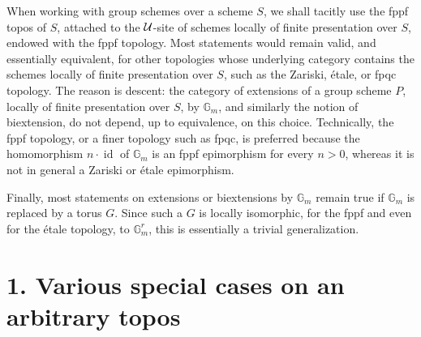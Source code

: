 \documentclass[11pt]{article}
\providecommand{\Gm}{\mathbb G_m}
\providecommand{\id}{\operatorname{id}}
\begin{document}
When working with group schemes over a scheme \(S\), we shall tacitly use the fppf topos of \(S\), attached to the \(\mathcal U\)-site of schemes locally of finite presentation over \(S\), endowed with the fppf topology.  Most statements would remain valid, and essentially equivalent, for other topologies whose underlying category contains the schemes locally of finite presentation over \(S\), such as the Zariski, étale, or fpqc topology.  The reason is descent: the category of extensions of a group scheme \(P\), locally of finite presentation over \(S\), by \(\Gm\), and similarly the notion of biextension, do not depend, up to equivalence, on this choice.  Technically, the fppf topology, or a finer topology such as fpqc, is preferred because the homomorphism \(n\cdot\id\) of \(\Gm\) is an fppf epimorphism for every \(n>0\), whereas it is not in general a Zariski or étale epimorphism.

Finally, most statements on extensions or biextensions by \(\Gm\) remain true if \(\Gm\) is replaced by a torus \(G\).  Since such a \(G\) is locally isomorphic, for the fppf and even for the étale topology, to \(\Gm^r\), this is essentially a trivial generalization.

\section*{1. Various special cases on an arbitrary topos}
\end{document}
